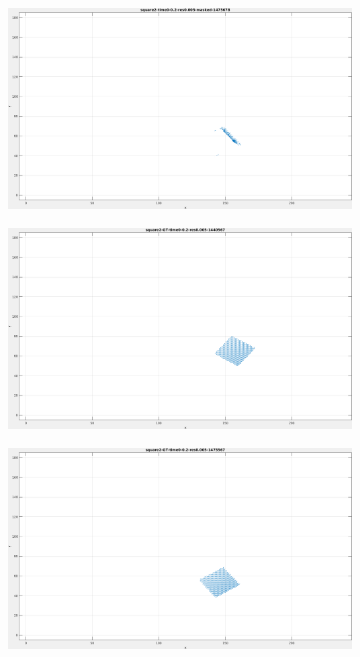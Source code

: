 \begin{figure}[tb]
\begin{subfigure}{.45\textwidth}
  \caption{}
\end{subfigure}
\begin{subfigure}{.45\textwidth}
  \centering
  \includegraphics[height=.6\linewidth]{figs/square2/square2-masked-2.png}
  \caption{}
\end{subfigure}
\begin{subfigure}{.45\textwidth}
  \centering
  \includegraphics[height=.6\linewidth]{figs/square2/square2-GT-1.png}
  \caption{}
\end{subfigure}
\begin{subfigure}{.45\textwidth}
  \centering
  \includegraphics[height=.6\linewidth]{figs/square2/square2-GT-2.png}

\end{subfigure}
\end{figure}
